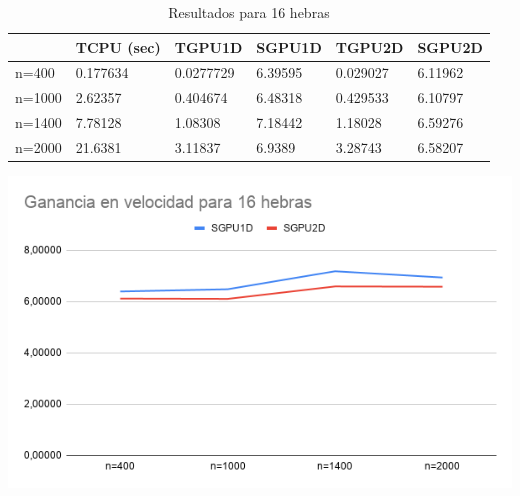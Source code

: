 \begin{table}[H]
	\centering
	\begin{tabular}{|l|l|l|l|l|l|}
		\hline
		& \cellcolor[HTML]{ECF4FF}TCPU (sec) & \cellcolor[HTML]{ECF4FF}TGPU1D & \cellcolor[HTML]{ECF4FF}SGPU1D & \cellcolor[HTML]{ECF4FF}TGPU2D & \cellcolor[HTML]{ECF4FF}SGPU2D \\ \hline
		\cellcolor[HTML]{FFFFC7}n=400  & 0.177634                           & 0.0277729                      & 6.39595                        & 0.029027                       & 6.11962                        \\ \hline
		\cellcolor[HTML]{FFFFC7}n=1000 & 2.62357                            & 0.404674                       & 6.48318                        & 0.429533                       & 6.10797                        \\ \hline
		\cellcolor[HTML]{FFFFC7}n=1400 & 7.78128                            & 1.08308                        & 7.18442                        & 1.18028                        & 6.59276                        \\ \hline
		\cellcolor[HTML]{FFFFC7}n=2000 & 21.6381                            & 3.11837                        & 6.9389                         & 3.28743                        & 6.58207                        \\ \hline
	\end{tabular}
	\caption{Resultados para 16 hebras}
\end{table}

\begin{center}
	\includegraphics[scale=0.5]{img/g16}
\end{center}

